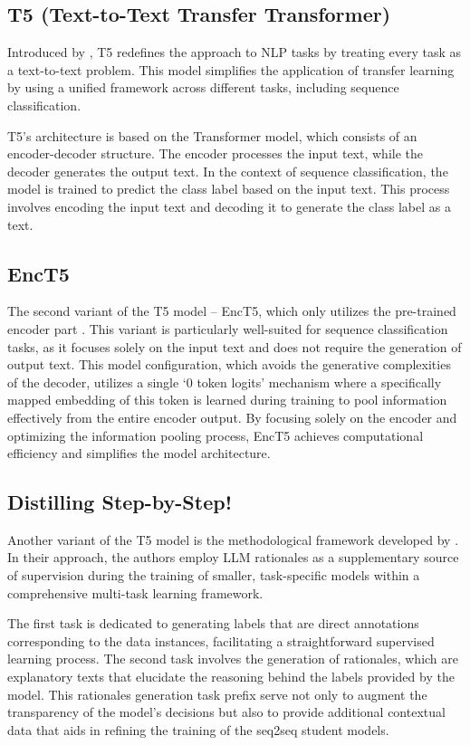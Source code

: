 \subsection{T5 (Text-to-Text Transfer Transformer)}

Introduced by \citeauthor{t5} \cite{t5}, T5 redefines the approach to NLP tasks by treating every task as a text-to-text problem. This model simplifies the application of transfer learning by using a unified framework across different tasks, including sequence classification.

T5's architecture is based on the Transformer model, which consists of an encoder-decoder structure. The encoder processes the input text, while the decoder generates the output text. In the context of sequence classification, the model is trained to predict the class label based on the input text. This process involves encoding the input text and decoding it to generate the class label as a text.

\subsection{EncT5}

The second variant of the T5 model -- EncT5, which only utilizes the pre-trained encoder part \cite{enct5}. This variant is particularly well-suited for sequence classification tasks, as it focuses solely on the input text and does not require the generation of output text. This model configuration, which avoids the generative complexities of the decoder, utilizes a single `0 token logits' mechanism where a specifically mapped embedding of this token is learned during training to pool information effectively from the entire encoder output. By focusing solely on the encoder and optimizing the information pooling process, EncT5 achieves computational efficiency and simplifies the model architecture.

\subsection{Distilling Step-by-Step!}

Another variant of the T5 model is the methodological framework developed by \citeauthor{stepbystep} \cite{stepbystep}. In their approach, the authors employ LLM rationales as a supplementary source of supervision during the training of smaller, task-specific models within a comprehensive multi-task learning framework. 

The first task is dedicated to generating labels that are direct annotations corresponding to the data instances, facilitating a straightforward supervised learning process. The second task involves the generation of rationales, which are explanatory texts that elucidate the reasoning behind the labels provided by the model. This rationales generation task prefix serve not only to augment the transparency of the model’s decisions but also to provide additional contextual data that aids in refining the training of the seq2seq student models.


